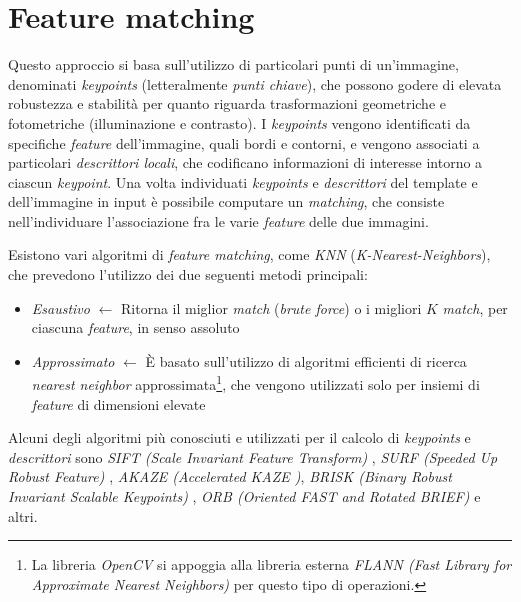 \section{Feature matching}
Questo approccio si basa sull'utilizzo di particolari punti di un'immagine, denominati \textit{keypoints} (letteralmente \textit{punti chiave}), che possono godere di elevata robustezza e stabilit\`a per quanto riguarda trasformazioni geometriche e fotometriche (illuminazione e contrasto). I \textit{keypoints} vengono identificati da specifiche \textit{feature} dell'immagine, quali bordi e contorni, e vengono associati a particolari \textit{descrittori locali}, che codificano informazioni di interesse intorno a ciascun \textit{keypoint}. Una volta individuati \textit{keypoints} e \textit{descrittori} del template e dell'immagine in input \`e possibile computare un \textit{matching}, che consiste nell'individuare l'associazione fra le varie \textit{feature} delle due immagini.\par
Esistono vari algoritmi di \textit{feature matching}, come \textit{KNN} (\textit{K-Nearest-Neighbors}), che prevedono l'utilizzo dei due seguenti metodi principali:
\begin{itemize}
	\item \textit{Esaustivo} $\gets$ Ritorna il miglior \textit{match} (\textit{brute force}) o i migliori $K$ \textit{match}, per ciascuna \textit{feature}, in senso assoluto
	\item \textit{Approssimato} $\gets$ \`E basato sull'utilizzo di algoritmi efficienti di ricerca \textit{nearest neighbor} approssimata\footnote{La libreria \textit{OpenCV} si appoggia alla libreria esterna \textit{FLANN (Fast Library for Approximate Nearest Neighbors)} per questo tipo di operazioni.}, che vengono utilizzati solo per insiemi di \textit{feature} di dimensioni elevate 
\end{itemize}\par
Alcuni degli algoritmi pi\`u conosciuti e utilizzati per il calcolo di \textit{keypoints} e \textit{descrittori} sono \textit{SIFT (Scale Invariant Feature Transform)} \cite{bib:sift}, \textit{SURF (Speeded Up Robust Feature)} \cite{bib:surf}, \textit{AKAZE (Accelerated KAZE \cite{bib:kaze})}, \textit{BRISK (Binary Robust Invariant Scalable Keypoints)} \cite{bib:brisk}, \textit{ORB (Oriented FAST and Rotated BRIEF)} \cite{bib:orb} e altri.


